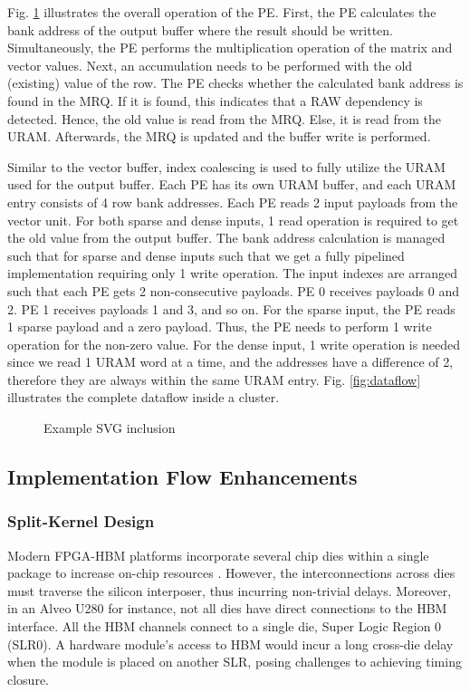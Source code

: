 \documentclass[manuscript,screen,review]{acmart}
\begin{document}
Fig. \ref{fig:pe} illustrates the overall operation of the PE. First, the PE calculates the bank address of the output buffer where the result should be written. Simultaneously, the PE performs the multiplication operation of the matrix and vector values. Next, an accumulation needs to be performed with the old (existing) value of the row. The PE checks whether the calculated bank address is found in the MRQ. If it is found, this indicates that a RAW dependency is detected. Hence, the old value is read from the MRQ. Else, it is read from the URAM. Afterwards, the MRQ is updated and the buffer write is performed. 

Similar to the vector buffer, index coalescing is used to fully utilize the URAM used for the output buffer. Each PE has its own URAM buffer, and each URAM entry consists of 4 row bank addresses. Each PE reads 2 input payloads from the vector unit. For both sparse and dense inputs, 1 read operation is required to get the old value from the output buffer. The bank address calculation is managed such that for sparse and dense inputs such that we get a fully pipelined implementation requiring only 1 write operation. The input indexes are arranged such that each PE gets 2 non-consecutive payloads. PE 0 receives payloads 0 and 2. PE 1 receives payloads 1 and 3, and so on. For the sparse input, the PE reads 1 sparse payload and a zero payload. Thus, the PE needs to perform 1 write operation for the non-zero value. For the dense input, 1 write operation is needed since we read 1 URAM word at a time, and the addresses have a difference of 2, therefore they are always within the same URAM entry.  Fig. \ref{fig:dataflow} illustrates the complete dataflow inside a cluster.


\begin{figure}[h]
	\centering
	
	\caption{Example SVG inclusion}
	\label{fig:pe}
\end{figure}

\subsection{Implementation Flow Enhancements}
\subsubsection{Split-Kernel Design}

Modern FPGA-HBM platforms incorporate several chip dies within a single package to
increase on-chip resources \cite{autobridge}. However, the interconnections across dies must traverse the silicon interposer, thus incurring non-trivial delays.
Moreover, in an Alveo U280 for instance, not all dies have direct connections to the HBM interface. All the HBM channels connect to a single die, Super Logic Region 0 (SLR0). A hardware module’s access to HBM would incur a long cross-die delay when the module is placed on another SLR, posing challenges to achieving timing closure.
\end{document}
